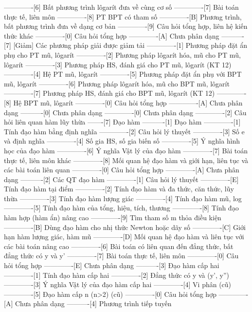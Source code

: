 -------------[6] Bất phương trình lôgarít đưa về cùng cơ số
-------------[7] Bài toán thực tế, liên môn
-------------[8] PT BPT có tham số
-------------[B] Phương trình, bất phương trình đưa về dạng cơ bản
-------------[9] Câu hỏi tổng hợp, liên hệ kiến thức khác
-------------[0] Câu hỏi tổng hợp 
-------------[A] Chưa phân dạng
----------[7] [Giảm] Các phương pháp giải được giảm tải
-------------[1] Phương pháp đặt ẩn phụ cho PT mũ, lôgarít
-------------[2] Phương pháp lôgarít hóa, mũ cho PT mũ, lôgarít
-------------[3] Phương pháp HS, đánh giá cho PT mũ, lôgarít (KT 12)
-------------[4] Hệ PT mũ, lôgarít
-------------[5] Phương pháp đặt ẩn phụ với BPT mũ, lôgarít
-------------[6] Phương pháp lôgarít hóa, mũ cho BPT mũ, lôgarít
-------------[7] Phương pháp HS, đánh giá cho BPT mũ, lôgarít (KT 12)
-------------[8] Hệ BPT mũ, lôgarít
-------------[0] Câu hỏi tổng hợp
-------------[A] Chưa phân dạng
----------[0] Chưa phân dạng
-------------[0] Chưa phân dạng
-------------[2] Câu hỏi liên quan hàm lũy thừa
-------[7] Đạo hàm
----------[1] Đạo hàm
-------------[1] Tính đạo hàm bằng định nghĩa
-------------[2] Câu hỏi lý thuyết
-------------[3] Số e và định nghĩa
-------------[4] Số gia HS, số gia biến số
-------------[5] Ý nghĩa hình học của đạo hàm
-------------[6] Ý nghĩa Vật lý của đạo hàm
-------------[7] Bài toán thực tế, liên môn khác
-------------[8] Mối quan hệ đạo hàm và giới hạn, liên tục và các bài toán liên quan
-------------[0] Câu hỏi tổng hợp
-------------[A] Chưa phân dạng
----------[2] Các QT đạo hàm
-------------[1] Câu hỏi lý thuyết
-------------[E] Tính đạo hàm tại điểm
-------------[2] Tính đạo hàm và đa thức, căn thức, lũy thừa 
-------------[3] Tính đạo hàm lượng giác
-------------[4] Tính đạo hàm mũ, log
-------------[5] Tính đạo hàm của tổng, hiệu, tích, thương
-------------[8] Tính đạo hàm hợp (hàm ẩn) nâng cao
-------------[9] Tìm tham số m thỏa điều kiện
-------------[B] Dùng đạo hàm cho nhị thức Newton hoặc dãy số
-------------[C] Giới hạn hàm lượng giác, hàm mũ
-------------[D] Mối quan hệ đạo hàm và liên tục với các bài toán nâng cao
-------------[6] Bài toán có liên quan đến đẳng thức, bất đẳng thức có y và y' 
-------------[7] Bài toán thực tế, liên môn
-------------[0] Câu hỏi tổng hợp
-------------[E] Chưa phân dạng
----------[3] Đạo hàm cấp hai
-------------[1] Tính đạo hàm cấp hai
-------------[2] Đẳng thức có y và (y', y'')
-------------[3] Ý nghĩa Vật lý của đạo hàm cấp hai
-------------[4] Vi phân (cũ)
-------------[5] Đạo hàm cấp n (n>2) (cũ)
-------------[0] Câu hỏi tổng hợp
-------------[A] Chưa phân dạng
----------[4] Phương trình tiếp tuyến
